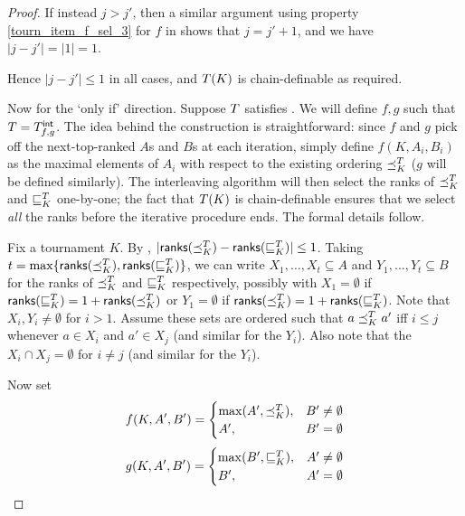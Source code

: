 \begin{proof}
    If instead $j > j'$, then a similar argument using property
    \cref{tourn_item_f_sel_3} for $f$ in  shows
    that $j = j' + 1$, and we have $|j - j'| = |1| = 1$.

    Hence $|j - j'| \le 1$ in all cases, and $T(K)$ is chain-definable as
    required.

    Now for the `only if' direction. Suppose $T$ satisfies
    \chaindef{}. We will define $f, g$ such that $T = {T_{f,g}^\mathsf{int}}$.
    The idea behind the construction is straightforward: since $f$ and $g$ pick
    off the next-top-ranked $A$s and $B$s at each iteration, simply define
    $f(K, A_i, B_i)$ as the maximal elements of $A_i$ with respect to the
    existing ordering ${\preceq_K^T}$ ($g$ will be defined similarly). The
    interleaving algorithm will then select the ranks of ${\preceq_K^T}$ and
    ${\sqsubseteq_K^T}$ one-by-one; the fact that $T(K)$ is chain-definable
    ensures that we select \emph{all} the ranks before the iterative procedure
    ends. The formal details follow.

    Fix a tournament $K$. By ,
    $|\mathsf{ranks}({{\preceq_K^T}}) - \mathsf{ranks}({{\sqsubseteq_K^T}})| \le 1$. Taking $t =
    \max\{\mathsf{ranks}({{\preceq_K^T}}), \mathsf{ranks}({{\sqsubseteq_K^T}})\}$, we can write $X_1,
    \ldots, X_t \subseteq A$ and $Y_1, \ldots, Y_t \subseteq B$ for the ranks
    of ${\preceq_K^T}$ and ${\sqsubseteq_K^T}$ respectively, possibly with $X_1 =
    \emptyset$ if $\mathsf{ranks}({{\sqsubseteq_K^T}}) = 1 + \mathsf{ranks}({{\preceq_K^T}})$ or $Y_1 =
    \emptyset$ if $\mathsf{ranks}({{\preceq_K^T}}) = 1 + \mathsf{ranks}({{\sqsubseteq_K^T}})$. Note
    that $X_i, Y_i \ne \emptyset$ for $i > 1$. Assume these sets are ordered
    such that $a \preceq_K^T a'$ iff $i \le j$ whenever $a \in X_i$ and $a' \in
    X_j$ (and similar for the $Y_i$). Also note that the $X_i \cap X_j =
    \emptyset$ for $i \ne j$ (and similar for the $Y_i$).

    Now set\footnotemark{}
    \[
        f(K, A', B') = \begin{cases}
           \max(A', {\preceq_K^T}),& B' \ne \emptyset \\
           A',& B' = \emptyset
        \end{cases}
    \]
    \[
        g(K, A', B') = \begin{cases}
            \max(B', {\sqsubseteq_K^T}),& A' \ne \emptyset \\
            B',& A' = \emptyset
        \end{cases}
    \]



\end{proof}
